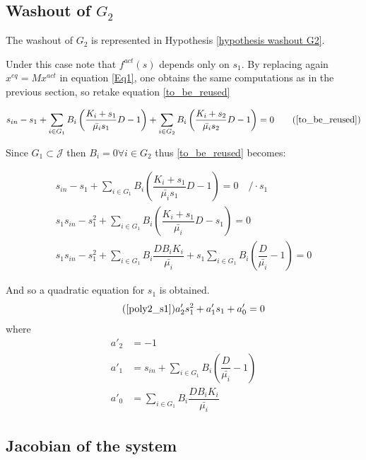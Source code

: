 \documentclass[processes,article,submit,moreauthors,pdftex]{Definitions/mdpi}
\begin{document}
\subsection{Washout of $G_2$}

The washout of $G_2$ is represented in Hypothesis \ref{hypothesis washout G2}. 

Under this case note that $f^{act}(s)$ depends only on $s_1$. By replacing again $x^{eq} = Mx^{act}$ in equation \eqref{Eq1}, one obtains the same computations as in the previous section, so retake equation \eqref{to_be_reused}

\begin{align}
\displaystyle s_{in} - s_1 + \sum \limits_{i \in G_1} B_i \left(\dfrac{K_i+s_1}{\bar{\mu_i}s_1}D - 1 \right) + \sum \limits_{i \in G_2 } B_i \left(\dfrac{K_i+s_2}{\bar{\mu_i}s_2}D - 1 \right)= 0  \tag{\ref{to_be_reused}}
\end{align}

Since $G_1 \subset \mathcal{J} $ then $B_i = 0 \forall i \in G_2$ thus \eqref{to_be_reused} becomes:


\begin{align}
\displaystyle s_{in} - s_1 + \sum \limits_{i \in G_1} B_i \left(\dfrac{K_i+s_1}{\bar{\mu_i}s_1}D - 1 \right) = 0 \quad /\cdot s_1 \\
\displaystyle s_1s_{in} - s_1^2 + \sum \limits_{i \in G_1} B_i \left(\dfrac{K_i+s_1}{\bar{\mu_i}}D - s_1 \right)= 0 \\
\displaystyle s_1s_{in} - s_1^2 + \sum \limits_{i \in G_1} B_i \dfrac{DB_iK_i}{\bar{\mu_i}} + s_1\sum \limits_{i \in G_1}B_i\left(\dfrac{D}{\bar{\mu_i}}-1\right) = 0
\end{align}

And so a quadratic equation for $s_1$ is obtained.
\begin{align}
\tag{\ref{poly2_s1}} a'_2 s_1^2 + a'_1s_1 + a'_0 = 0
\end{align}
where
\begin{align}
a'_2 &= -1 \\
a'_1 &= s_{in} + \sum \limits_{i \in G_1}B_i\left(\dfrac{D}{\bar{\mu_i}}-1\right) \\
a'_0 &=\sum \limits_{i \in G_1} B_i \dfrac{DB_iK_i}{\bar{\mu_i}} 
\end{align}

\subsection{Jacobian of the system}
\end{document}
